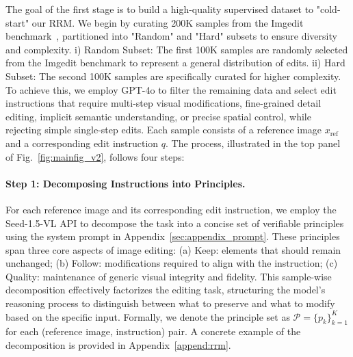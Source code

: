 The goal of the first stage is to build a high-quality supervised dataset to "cold-start" our RRM. We begin by curating 200K samples from the Imgedit benchmark~\citep{ye2025imgedit}, partitioned into "Random" and "Hard" subsets to ensure diversity and complexity. 
i) Random Subset: The first 100K samples are randomly selected from the Imgedit benchmark to represent a general distribution of edits. 
ii) Hard Subset: The second 100K samples are specifically curated for higher complexity. To achieve this, we employ GPT-4o to filter the remaining data and select edit instructions that require multi-step visual modifications, fine-grained detail editing, implicit semantic understanding, or precise spatial control, while rejecting simple single-step edits.
Each sample consists of a reference image $x_{\mathrm{ref}}$ and a corresponding edit instruction $q$.
The process, illustrated in the top panel of Fig.~\ref{fig:mainfig_v2}, follows four steps:
\vspace{-1.0em}
\paragraph{Step 1: Decomposing Instructions into Principles.}
For each reference image and its corresponding edit instruction, we employ the Seed-1.5-VL API to decompose the task into a concise set of verifiable principles using the system prompt in Appendix~\ref{sec:appendix_prompt}. These principles span three core aspects of image editing:
(a) Keep: elements that should remain unchanged;
(b) Follow: modifications required to align with the instruction;
(c) Quality: maintenance of generic visual integrity and fidelity.
This sample-wise decomposition effectively factorizes the editing task, structuring the model's reasoning process to distinguish between what to preserve and what to modify based on the specific input.
Formally, we denote the principle set as $\mathcal{P}=\{p_k\}_{k=1}^{K}$ for each (reference image, instruction) pair.
A concrete example of the decomposition is provided in Appendix~\ref{append:rrm}.
\vspace{-1.0em}
